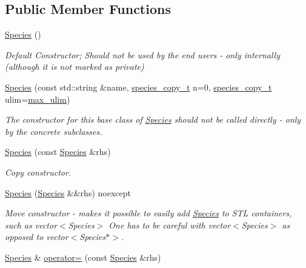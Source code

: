 \subsection*{Public Member Functions}
\begin{DoxyCompactItemize}
\item 
\hyperlink{classchem_1_1Species_a979ab4590bae72bf0a413b930212340d}{Species} ()
\begin{DoxyCompactList}\small\item\em Default Constructor; Should not be used by the end users -\/ only internally (although it is not marked as private) \end{DoxyCompactList}\item 
\hyperlink{classchem_1_1Species_a2d67fe2e075842ed5877143f5771f51b}{Species} (const std\-::string \&name, \hyperlink{common_8h_a3503f321fd36304ee274141275cca586}{species\-\_\-copy\-\_\-t} n=0, \hyperlink{common_8h_a3503f321fd36304ee274141275cca586}{species\-\_\-copy\-\_\-t} ulim=\hyperlink{common_8h_adaf831a0b61083f29adf8fc6e8edab35}{max\-\_\-ulim})
\begin{DoxyCompactList}\small\item\em The constructor for this base class of \hyperlink{classchem_1_1Species}{Species} should not be called directly -\/ only by the concrete subclasses. \end{DoxyCompactList}\item 
\hyperlink{classchem_1_1Species_a785e10df4d7bc79b69a254f6cd296678}{Species} (const \hyperlink{classchem_1_1Species}{Species} \&rhs)
\begin{DoxyCompactList}\small\item\em Copy constructor. \end{DoxyCompactList}\item 
\hyperlink{classchem_1_1Species_a4a2af0ad2237d60a579e53c0410a8627}{Species} (\hyperlink{classchem_1_1Species}{Species} \&\&rhs) noexcept
\begin{DoxyCompactList}\small\item\em Move constructor -\/ makes it possible to easily add \hyperlink{classchem_1_1Species}{Species} to S\-T\-L containers, such as vector$<$\-Species$>$ One has to be careful with vector$<$\-Species$>$ as opposed to vector$<$\-Species$\ast$$>$. \end{DoxyCompactList}\item 
\hyperlink{classchem_1_1Species}{Species} \& \hyperlink{classchem_1_1Species_ae885477a490e183f1981cf2591cdbee8}{operator=} (const \hyperlink{classchem_1_1Species}{Species} \&rhs)

\end{DoxyCompactItemize}
